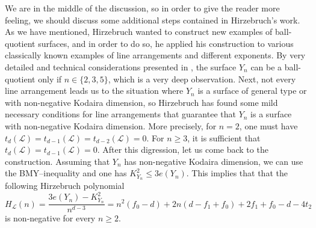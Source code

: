 \documentclass{article}
\theoremstyle{plain}
\theoremstyle{definition}
\numberwithin{equation}{section}
\begin{document}
We are in the middle of the discussion, so in order to give the reader more feeling, we should discuss some additional steps contained in Hirzebruch's work. As we have mentioned, Hirzebruch wanted to construct new examples of ball-quotient surfaces, and in order to do so, he applied his construction to various classically known examples of line arrangements and different exponents. By very detailed and technical considerations presented in \cite{BHH87}, the surface $Y_{n}$ can be a ball-quotient only if $n \in \{2,3,5\}$, which is a very deep observation. Next, not every line arrangement leads us to the situation where $Y_{n}$ is a surface of general type or with non-negative Kodaira dimension, so Hirzebruch has found some mild necessary conditions for line arrangements that guarantee that $Y_{n}$ is a surface with non-negative Kodaira dimension. More precisely, for $n=2$, one must have $t_{d}(\mathcal{L}) = t_{d-1}(\mathcal{L}) = t_{d-2}(\mathcal{L}) = 0$. For $n\geq 3$, it is sufficient that $t_{d}(\mathcal{L}) = t_{d-1}(\mathcal{L}) = 0$. After this digression, let us come back to the construction. Assuming that $Y_{n}$ has non-negative Kodaira dimension, we can use the BMY--inequality \cite{Miyaoka77} and one has $K^{2}_{Y_{n}} \leq 3e(Y_{n})$. This implies that that the following Hirzebruch polynomial
\[H_{\mathcal{L}}(n) = \frac{3e(Y_{n}) - K^{2}_{Y_{n}}}{n^{d-3}} = n^{2}(f_{0}-d) + 2n(d-f_{1}+f_{0}) + 2f_{1}+f_{0}-d-4t_{2}\]
is non-negative for every $n\geq 2$.
\end{document}
